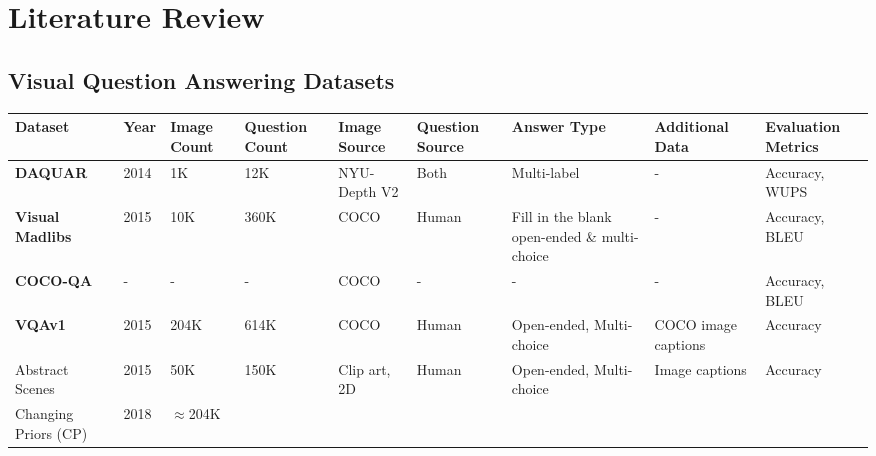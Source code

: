 \chapter{Literature Review}

\section{Visual Question Answering Datasets}

\begin{center}
\begin{xltabular}{\textwidth}{LLLLLLLLL}
  \toprule
  \textbf{Dataset}
  & \textbf{Year}
  & \textbf{Image Count}
  & \textbf{Question Count}
  & \textbf{Image Source}
  & \textbf{Question Source}
  & \textbf{Answer Type}
  & \textbf{Additional Data}
  & \textbf{Evaluation Metrics}\\
  \midrule
  \textbf{DAQUAR} \cite{malinowski2014multiworld}
  & 2014
  & 1K  %
  & 12K  %
  & NYU-Depth V2 \cite{silberman2012indoor}
  & Both
  & Multi-label  %
  & -
  & Accuracy, WUPS \\
  \textbf{Visual Madlibs} \cite{yu2015visual}
  & 2015
  & 10K  %
  & 360K  %
  & COCO \cite{lin2014microsoft}
  & Human
  & Fill in the blank open-ended \& multi-choice
  & -
  & Accuracy, BLEU \\
  \textbf{COCO-QA}
  & -
  & -
  & -
  & COCO
  & -
  & -
  & -
  & Accuracy, BLEU \\
  \textbf{VQAv1} \cite{antol2015vqa}
  & 2015
  & 204K  %
  & 614K  %
  & COCO
  & Human
  & Open-ended, Multi-choice
  & COCO image captions
  & Accuracy\footnotemark \\
  Abstract Scenes
  & 2015
  & 50K  %
  & 150K  %
  & Clip art, 2D
  & Human
  & Open-ended, Multi-choice
  & Image captions
  & Accuracy\footnotemark[\value{footnote}] \\
  Changing Priors (CP) \cite{agrawal2018dont}
  & 2018
  & {\color{red}\(\approx\)204K}  %

\end{xltabular}
\end{center}
